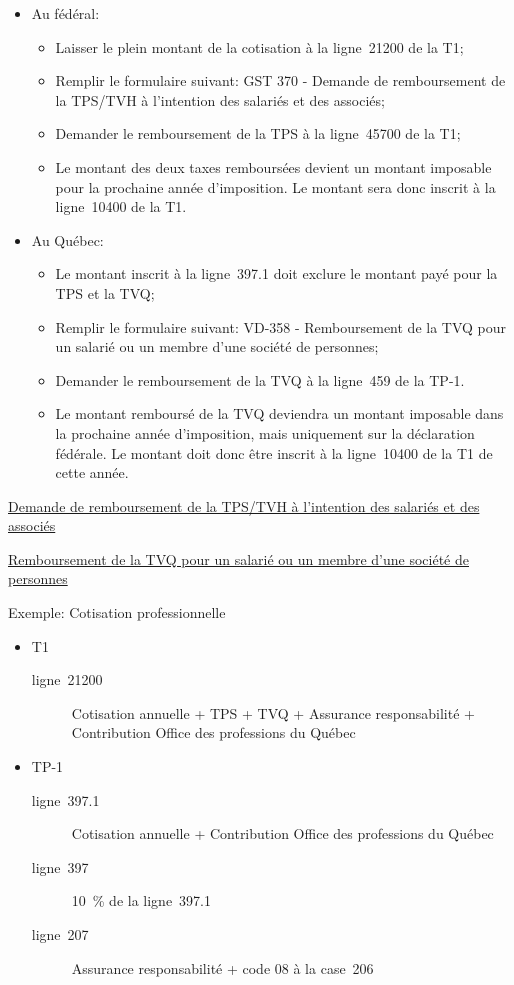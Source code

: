 \begin{itemize}
	\item Au fédéral:
	\begin{itemize}
		\item Laisser le plein montant de la cotisation à la ligne~21200 de la T1;
		\item Remplir le formulaire suivant: GST 370 - Demande de remboursement de la TPS/TVH à l'intention des salariés et des associés;
		\item Demander le remboursement de la TPS à la ligne~45700 de la T1; 
		\item Le montant des deux taxes remboursées devient un montant imposable pour la prochaine année d'imposition. Le montant sera donc inscrit à la ligne~10400 de la T1.
	\end{itemize}
	\item Au Québec:
	\begin{itemize}
		\item Le montant inscrit à la ligne~397.1 doit exclure le montant payé pour la TPS et la TVQ;
		\item Remplir le formulaire suivant: VD-358 - Remboursement de la TVQ pour un salarié ou un membre d'une société de personnes; 
		\item Demander le remboursement de la TVQ à la ligne~459 de la TP-1.
		\item Le montant remboursé de la TVQ deviendra un montant imposable dans la prochaine année d'imposition, mais uniquement sur la déclaration fédérale. Le montant doit donc être inscrit à la ligne~10400 de la T1 de cette année.
	\end{itemize}
\end{itemize}

\cat\href{https://www.canada.ca/content/dam/cra-arc/formspubs/pbg/gst370/gst370-22f.pdf}{Demande de remboursement de la TPS/TVH à l'intention des salariés et des associés}

\qct\href{https://www.revenuquebec.ca/fr/services-en-ligne/formulaires-et-publications/details-courant/vd-358/}{Remboursement de la TVQ pour un salarié ou un membre d'une société de personnes}

Exemple: Cotisation professionnelle
\begin{itemize}
	\item T1
	\begin{description}
		\item[ligne~21200] Cotisation annuelle + TPS + TVQ + Assurance responsabilité + Contribution Office des professions du Québec
	\end{description}
	\item TP-1
	\begin{description}
		\item[ligne~397.1] Cotisation annuelle + Contribution Office des professions du Québec
		\item[ligne~397] 10~\% de la ligne~397.1
		\item[ligne~207]  Assurance responsabilité + code 08 à la case~206
	\end{description}
\end{itemize}



